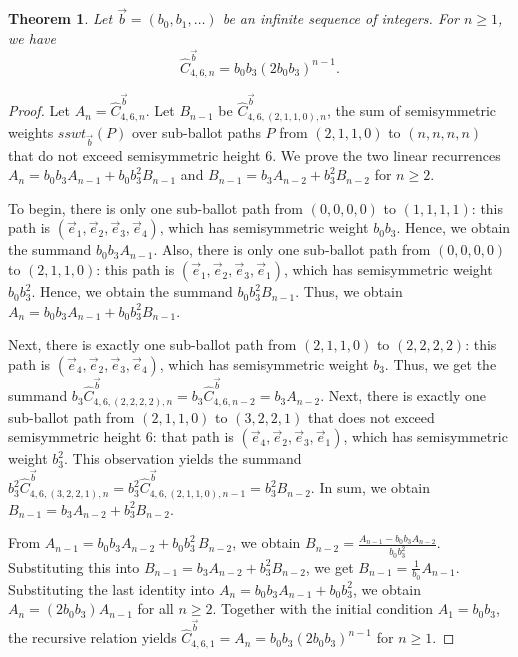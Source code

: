 \documentclass[11pt]{article}
\newtheorem{theorem}{Theorem}[section]
\theoremstyle{remark}
\theoremstyle{definition}
\begin{document}
\begin{theorem}
\label{thm:42}
    Let $\vec{b} = (b_0, b_1, \dots)$ be an infinite sequence of integers. For $n \geq 1$, we have \[\widehat{C}_{4, 6,n}^{\vec{b}} = b_0b_3(2b_0b_3)^{n-1}.\]
    \end{theorem}
    
    \begin{proof}
    
        Let $A_n = \widehat{C}_{4, 6, n}^{\vec{b}}$. Let $B_{n-1} $ be $\widehat{C}_{4, 6, (2, 1, 1, 0), n}^{\vec{b}}$, the sum of semisymmetric weights $sswt_{\vec{b}}(P)$ over sub-ballot paths $P$ from $(2, 1, 1, 0)$ to $(n, n, n,n)$ that do not exceed semisymmetric height $6$. We prove the two linear recurrences $A_n = b_0b_3A_{n-1}+b_0b_3^2B_{n-1}$ and $B_{n-1} = b_3A_{n-2}+b_3^2B_{n-2}$ for $n \geq 2$.

To begin, there is only one sub-ballot path from $(0, 0, 0, 0)$ to $(1,1,1,1)$: this path is $(\vec{e}_1, \vec{e}_2, \vec{e}_3, \vec{e}_4)$, which has semisymmetric weight $b_0b_3$. Hence, we obtain the summand $b_0b_3A_{n-1}$. Also, there is only one sub-ballot path from $(0, 0, 0, 0)$ to $(2,1,1,0)$: this path is $(\vec{e}_1, \vec{e}_2, \vec{e}_3, \vec{e}_1)$, which has semisymmetric weight $b_0b_3^2$. Hence, we obtain the summand $b_0b_3^2B_{n-1}$. Thus, we obtain $A_n = b_0b_3A_{n-1}+b_0b_3^2B_{n-1}$.


Next, there is exactly one sub-ballot path from $(2, 1, 1, 0)$ to $(2, 2, 2, 2)$: this path is $(\vec{e}_4, \vec{e}_2, \vec{e}_3, \vec{e}_4)$, which has semisymmetric weight $b_3$. Thus, we get the summand $b_3\widehat{C}_{4, 6, (2, 2, 2, 2), n}^{\vec{b}} = b_3\widehat{C}_{4, 6, n-2}^{\vec{b}} = b_3A_{n-2}$. Next, there is exactly one sub-ballot path from $(2, 1, 1, 0)$ to $(3, 2, 2, 1)$ that does not exceed semisymmetric height $6$: that path is $(\vec{e}_4, \vec{e}_2, \vec{e}_3, \vec{e}_1)$, which has semisymmetric weight $b_3^2$. This observation yields the summand $b_3^2\widehat{C}_{4, 6, (3, 2, 2, 1), n}^{\vec{b}} = b_3^2\widehat{C}_{4, 6, (2, 1, 1, 0), n-1}^{\vec{b}} = b_3^2 B_{n-2}$. In sum, we obtain $B_{n-1} = b_3A_{n-2}+b_3^2B_{n-2}$.

From $
A_{n-1} = b_0b_3 A_{n-2} + b_0 b_3^2 \, B_{n-2}$,
we obtain $B_{n-2} = \frac{A_{n-1} - b_0 b_3 A_{n-2}}{b_0 b_3^2}.$ Substituting this into $B_{n-1} = b_3A_{n-2}+b_3^2B_{n-2}$, we get $B_{n-1} = \frac{1}{b_0} A_{n-1}$. Substituting the last identity into $A_n = b_0b_3A_{n-1}+b_0b_3^2$, we obtain $A_n = (2b_0b_3)A_{n-1}$ for all $n \geq 2$. Together with the initial condition $A_{1} = b_0b_3$, the recursive relation yields $\widehat{C}_{4, 6, 1}^{\vec{b}}  = A_n = b_0b_3(2b_0b_3)^{n-1}$ for $n \geq 1$.
 \end{proof}
\end{document}
